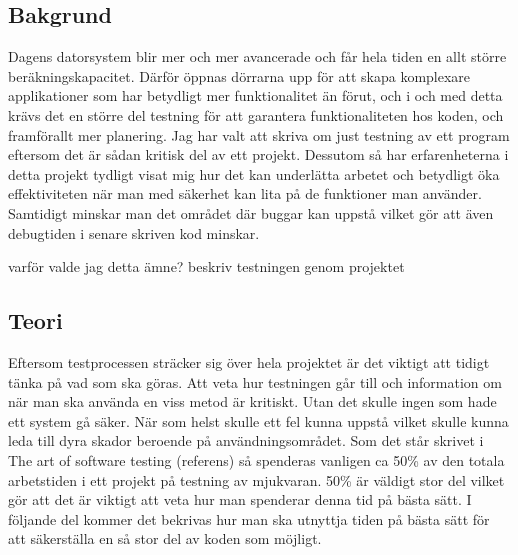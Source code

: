 	\subsection{Bakgrund}
	
	Dagens datorsystem blir mer och mer avancerade och får hela tiden en allt större beräkningskapacitet. Därför öppnas dörrarna upp för att skapa komplexare applikationer som har betydligt mer funktionalitet än förut, och i och med detta krävs det en större del testning för att garantera funktionaliteten hos koden, och framförallt mer planering. \newline
	Jag har valt att skriva om just testning av ett program eftersom det är sådan kritisk del av ett projekt. Dessutom så har erfarenheterna i detta projekt tydligt visat mig hur det kan underlätta arbetet och betydligt öka effektiviteten när man med säkerhet kan lita på de funktioner man använder. Samtidigt minskar man det området där buggar kan uppstå vilket gör att även debugtiden i senare skriven kod minskar. \newline
	
	varför valde jag detta ämne?
	beskriv testningen genom projektet
	
	
	\subsection{Teori}
	Eftersom testprocessen sträcker sig över hela projektet är det viktigt att tidigt tänka på vad som ska göras. Att veta hur testningen går till och information om när man ska använda en viss metod är kritiskt. Utan det skulle ingen som hade ett system gå säker. När som helst skulle ett fel kunna uppstå vilket skulle kunna leda till dyra skador beroende på användningsområdet. \newline
	Som det står skrivet i The art of software testing (referens) så spenderas vanligen ca 50\% av den totala arbetstiden i ett projekt på testning av mjukvaran. 50\% är väldigt stor del vilket gör att det är viktigt att veta hur man spenderar denna tid på bästa sätt. I följande del kommer det bekrivas hur man ska utnyttja tiden på bästa sätt för att säkerställa en så stor del av koden som möjligt.
	
